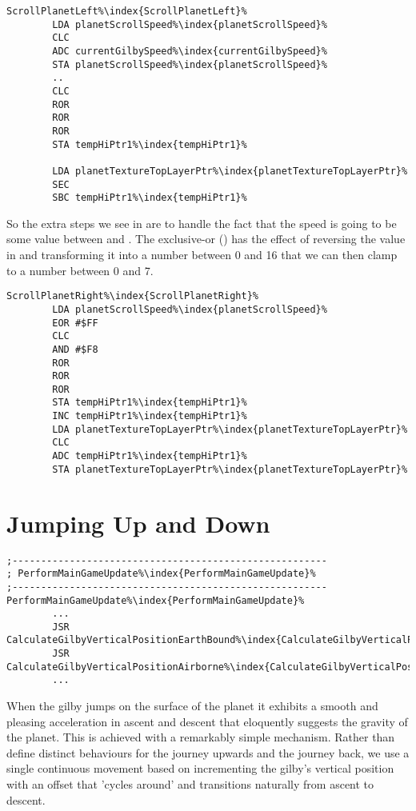 \begin{lstlisting}[escapechar=\%]
ScrollPlanetLeft%\index{ScrollPlanetLeft}%
        LDA planetScrollSpeed%\index{planetScrollSpeed}%
        CLC
        ADC currentGilbySpeed%\index{currentGilbySpeed}%
        STA planetScrollSpeed%\index{planetScrollSpeed}%
        ..
        CLC
        ROR
        ROR
        ROR
        STA tempHiPtr1%\index{tempHiPtr1}%

        LDA planetTextureTopLayerPtr%\index{planetTextureTopLayerPtr}%
        SEC
        SBC tempHiPtr1%\index{tempHiPtr1}%
\end{lstlisting}

So the extra steps we see in  are to handle the fact that the speed is going to be some value
between  and . The exclusive-or () has the effect of reversing the value in 
and transforming it into a number between 0 and 16 that we can then clamp to a number between 0 and 7.


\begin{lstlisting}[escapechar=\%]
ScrollPlanetRight%\index{ScrollPlanetRight}%   
        LDA planetScrollSpeed%\index{planetScrollSpeed}%
        EOR #$FF
        CLC
        AND #$F8
        ROR
        ROR
        ROR
        STA tempHiPtr1%\index{tempHiPtr1}%
        INC tempHiPtr1%\index{tempHiPtr1}%
        LDA planetTextureTopLayerPtr%\index{planetTextureTopLayerPtr}%
        CLC
        ADC tempHiPtr1%\index{tempHiPtr1}%
        STA planetTextureTopLayerPtr%\index{planetTextureTopLayerPtr}%
\end{lstlisting}


\section{Jumping Up and Down}
\begin{lstlisting}[caption=The routines responsible for updating the Gilby's vertical position.,escapechar=\%]
;-------------------------------------------------------
; PerformMainGameUpdate%\index{PerformMainGameUpdate}%
;-------------------------------------------------------
PerformMainGameUpdate%\index{PerformMainGameUpdate}%
        ...
        JSR CalculateGilbyVerticalPositionEarthBound%\index{CalculateGilbyVerticalPositionEarthBound}%
        JSR CalculateGilbyVerticalPositionAirborne%\index{CalculateGilbyVerticalPositionAirborne}%
        ...

\end{lstlisting}
When the gilby jumps on the surface of the planet it exhibits a smooth and pleasing acceleration in ascent and descent that
eloquently suggests the gravity of the planet. This is achieved with a remarkably simple mechanism. Rather than define
distinct behaviours for the journey upwards and the journey back, we use a single continuous movement based on incrementing
the gilby's vertical position with an offset that 'cycles around' and transitions naturally from ascent to descent.

